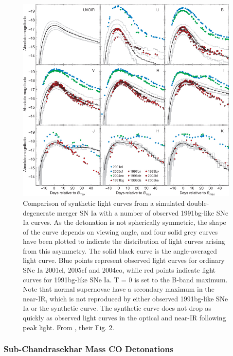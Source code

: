 \begin{figure}
\centerline{\includegraphics[width=0.8\hsize]{pakmorfig.jpg}}
\caption{Comparison of synthetic light curves from a simulated double-degenerate merger SN Ia with a number of observed 1991bg-like SNe Ia curves.  As the detonation is not spherically symmetric, the shape of the curve depends on viewing angle, and four solid grey curves have been plotted to indicate the distribution of light curves arising from this asymmetry.  The solid black curve is the angle-averaged light curve.  Blue points represent observed light curves for ordinary SNe Ia 2001el, 2005cf and 2004eo, while red points indicate light curves for 1991bg-like SNe Ia.  T = 0 is set to the B-band maximum.  Note that normal supernovae have a secondary maximum in the near-IR, which is not reproduced by either observed 1991bg-like SNe Ia or the synthetic curve.  The synthetic curve does not drop as quickly as observed light curves in the optical and near-IR following peak light.  From \cite{pakm+10}, their Fig. 2.}
\label{pakmorfigure}
\end{figure}

\subsubsection{Sub-Chandrasekhar Mass CO Detonations}
\label{sssec:sub-chandrasekharmasscodetonations}

